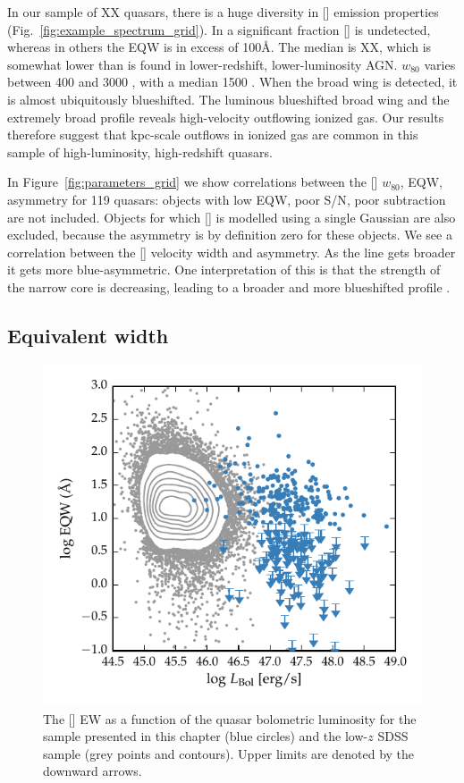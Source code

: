 In our sample of XX quasars, there is a huge diversity in [] emission properties (Fig.~\ref{fig:example_spectrum_grid}). 
In a significant fraction [] is undetected, whereas in others the \ac{EQW} is in excess of 100\AA. 
The median is XX, which is somewhat lower than is found in lower-redshift, lower-luminosity AGN. 
$w_{80}$ varies between 400 and 3000 \kms, with a median 1500 \kms.  
When the broad wing is detected, it is almost ubiquitously blueshifted.
The luminous blueshifted broad wing and the extremely broad profile reveals high-velocity outflowing ionized gas. 
Our results therefore suggest that kpc-scale outflows in ionized gas are common in this sample of high-luminosity, high-redshift quasars.

In Figure~\ref{fig:parameters_grid} we show correlations between the [] $w_{80}$, EQW, asymmetry for 119 quasars: objects with low \ac{EQW}, poor \ac{S/N}, poor  subtraction are not included. 
Objects for which [] is modelled using a single Gaussian are also excluded, because the asymmetry is by definition zero for these objects.   
We see a correlation between the [] velocity width and asymmetry. 
As the line gets broader it gets more blue-asymmetric. 
One interpretation of this is that the strength of the narrow core is decreasing, leading to a broader and more blueshifted profile \citep[e.g.][]{shen14}. 

\subsection{Equivalent width}

\begin{figure}
    \includegraphics[width=\columnwidth]{figures/chapter04/eqw_lum.pdf} 
    \caption{The [] EW as a function of the quasar bolometric luminosity for the sample presented in this chapter (blue circles) and the low-$z$ SDSS sample (grey points and contours). Upper limits are denoted by the downward arrows.}     
    \label{fig:eqw_lum}
\end{figure}

